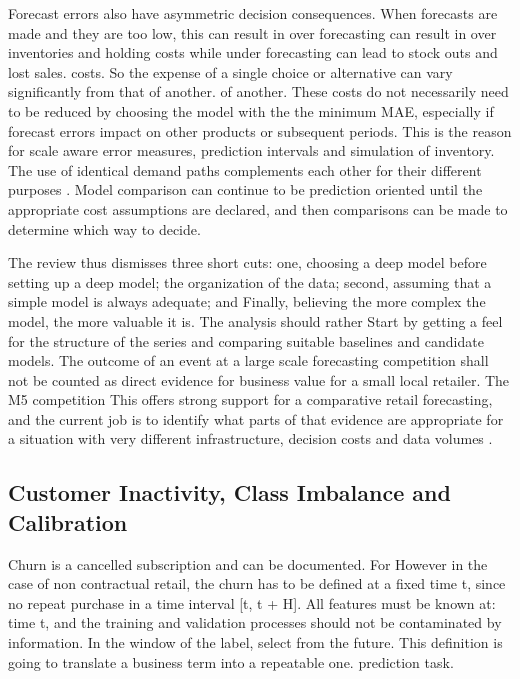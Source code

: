 \documentclass[a4paper,11pt,oneside]{book}
\theoremstyle{plain}
\theoremstyle{definition}
\theoremstyle{remark}
\begin{document}
Forecast errors also have asymmetric decision consequences. When forecasts are made and they are too low, this can result in over forecasting can result in over inventories and holding costs while under forecasting can lead to stock outs and lost sales. costs. So the expense of a single choice or alternative can vary significantly from that of another. of another. These costs do not necessarily need to be reduced by choosing the model with the the minimum MAE, especially if forecast errors impact on other products or subsequent periods. This is the reason for scale aware error measures, prediction intervals and simulation of inventory. The use of identical demand paths complements each other for their different purposes \cite{hyndman2006accuracy,syntetos2010stock}. Model comparison can continue to be prediction oriented until the appropriate cost assumptions are declared, and then comparisons can be made to determine which way to decide.

The review thus dismisses three short cuts: one, choosing a deep model before setting up a deep model; the organization of the data; second, assuming that a simple model is always adequate; and Finally, believing the more complex the model, the more valuable it is. The analysis should rather Start by getting a feel for the structure of the series and comparing suitable baselines and candidate models. The outcome of an event at a large scale forecasting competition shall not be counted as direct evidence for business value for a small local retailer. The M5 competition This offers strong support for a comparative retail forecasting, and the current job is to identify what parts of that evidence are appropriate for a situation with very different infrastructure, decision costs and data volumes \cite{makridakis2022m5}.

\subsection{Customer Inactivity, Class Imbalance and Calibration}

Churn is a cancelled subscription and can be documented. For However in the case of non contractual retail, the churn has to be defined at a fixed time t, since no repeat purchase in a time interval [t, t + H]. All features must be known at: time t, and the training and validation processes should not be contaminated by information. In the window of the label, select from the future. This definition is going to translate a business term into a repeatable one. prediction task.
\end{document}
